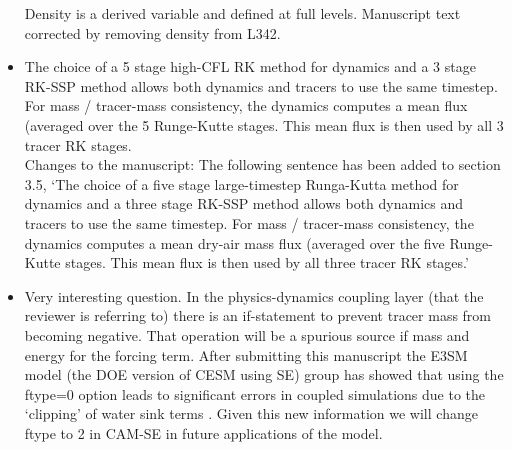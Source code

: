 \documentclass[11pt]{article}
\begin{document}
\begin{itemize}
Density is a derived variable and defined at full levels. Manuscript text corrected by removing density from L342.

\item {\color{blue}{Section ``3.5 Temporal discretization'':
This section details the rational for using different time stepping schemes for different equations or operations. What is missing is to point out if there exist any links between the schemes. In particular I am wondering how tracer mass conservation and mass-wind consistency is achieved with different schemes for advection and the continuity equation. Does the ``faster'' dynamics provide dry-air mass flux information from its se\_rsplit dynamics steps to the ``slower'' tracer advection step?}}

The choice of a 5 stage high-CFL RK method for dynamics and a 3 stage RK-SSP method
allows both dynamics and tracers to use the same timestep.  
For mass / tracer-mass consistency, the dynamics computes a mean flux (averaged over
the 5 Runge-Kutte stages.  This mean flux is then used by all 3 tracer RK stages.\\

Changes to the manuscript: The following sentence has been added to section 3.5, `The choice of a five stage large-timestep Runga-Kutta method for dynamics and a three stage RK-SSP method allows both dynamics and tracers to use the same timestep. For mass / tracer-mass consistency, the dynamics computes a mean dry-air mass flux (averaged over the five Runge-Kutte stages. This mean flux is then used by all three tracer RK stages.'

\item {\color{blue}{L545-550: Tracer concentrations need to be positive definite as outlined, which may require some sort of limiters. When water tracers are involved, such mechanisms, however, not only affect the tracer budgets, but generally also the energetics. Does CAM-SE relate tracer tendency limitations to the energetics? Or does ``setting to zero'' of a mixing ratio necessarily cause an energetic inconsistency? It would be valuable to have some explanation on this aspect.}}

Very interesting question. In the physics-dynamics coupling layer (that the reviewer is referring to) there is an if-statement to prevent tracer mass from becoming negative. That operation will be a spurious source if mass and energy for the forcing term. After submitting this manuscript the E3SM model (the DOE version of CESM using SE) group has showed that using the ftype=0 option leads to significant errors in coupled simulations due to the `clipping' of water sink terms \citep{water-leak}. Given this new information we will change ftype to 2 in CAM-SE in future applications of the model.\\


\end{itemize}
\end{document}
